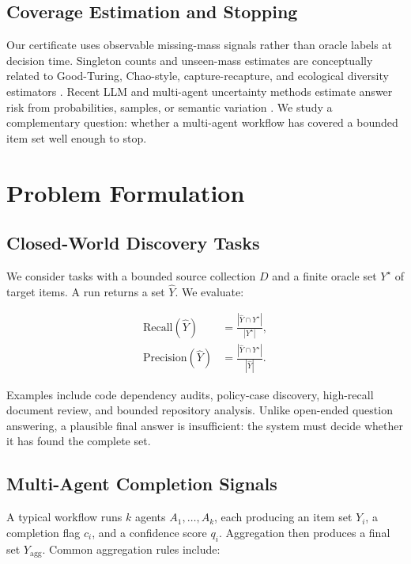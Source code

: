 \documentclass[letterpaper]{article}
\begin{document}
\subsection{Coverage Estimation and Stopping}

Our certificate uses observable missing-mass signals rather than oracle labels at
decision time. Singleton counts and unseen-mass estimates are conceptually
related to Good-Turing, Chao-style, capture-recapture, and ecological diversity
estimators \citep{good1953population,chao1984nonparametric,
mcAllester2000goodturing,chao2014rarefaction,bron2024chao}. Recent LLM and
multi-agent uncertainty methods
estimate answer risk from probabilities, samples, or semantic variation
\citep{kuhn2023semanticentropy,kadavath2022language,chen2026matu,
cole2023selectively}. We study a complementary question: whether a multi-agent
workflow has covered a bounded item set well enough to stop.

\section{Problem Formulation}

\subsection{Closed-World Discovery Tasks}

We consider tasks with a bounded source collection $D$ and a finite oracle set
$Y^\star$ of target items. A run returns a set $\hat{Y}$. We evaluate:

\begin{align}
\text{Recall}(\hat{Y}) &= \frac{|\hat{Y} \cap Y^\star|}{|Y^\star|}, \\
\text{Precision}(\hat{Y}) &= \frac{|\hat{Y} \cap Y^\star|}{|\hat{Y}|}.
\end{align}

Examples include code dependency audits, policy-case discovery, high-recall
document review, and bounded repository analysis. Unlike open-ended question
answering, a plausible final answer is insufficient: the system must decide
whether it has found the complete set.

\subsection{Multi-Agent Completion Signals}

A typical workflow runs $k$ agents $A_1, \ldots, A_k$, each producing an item set
$Y_i$, a completion flag $c_i$, and a confidence score $q_i$. Aggregation then
produces a final set $Y_{\text{agg}}$. Common aggregation rules include:
\end{document}
